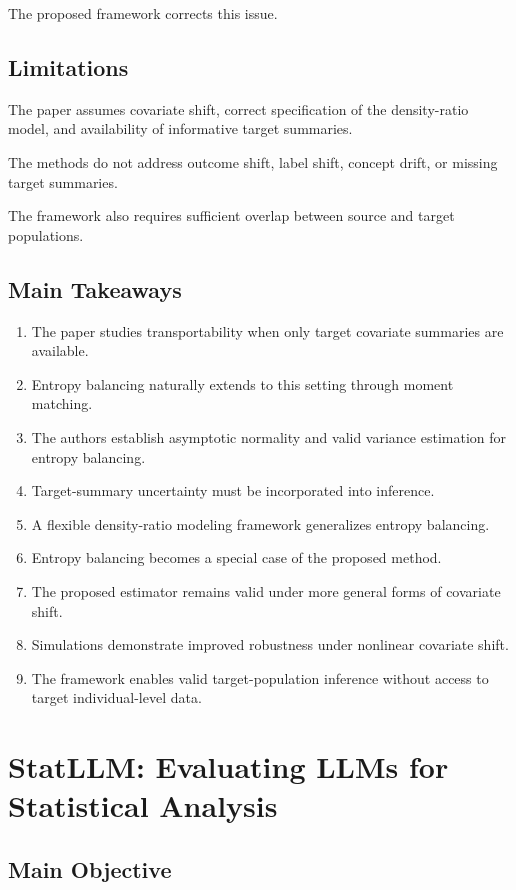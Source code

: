 \documentclass[11pt]{article}
\begin{document}
The proposed framework corrects this issue.

\subsection*{Limitations}

The paper assumes covariate shift, correct specification of the density-ratio model, and availability of informative target summaries.

The methods do not address outcome shift, label shift, concept drift, or missing target summaries.

The framework also requires sufficient overlap between source and target populations.

\subsection*{Main Takeaways}

\begin{enumerate}
    \item The paper studies transportability when only target covariate summaries are available.
    \item Entropy balancing naturally extends to this setting through moment matching.
    \item The authors establish asymptotic normality and valid variance estimation for entropy balancing.
    \item Target-summary uncertainty must be incorporated into inference.
    \item A flexible density-ratio modeling framework generalizes entropy balancing.
    \item Entropy balancing becomes a special case of the proposed method.
    \item The proposed estimator remains valid under more general forms of covariate shift.
    \item Simulations demonstrate improved robustness under nonlinear covariate shift.
    \item The framework enables valid target-population inference without access to target individual-level data.
\end{enumerate}

\section{StatLLM: Evaluating LLMs for Statistical Analysis}

\subsection*{Main Objective}
\end{document}
